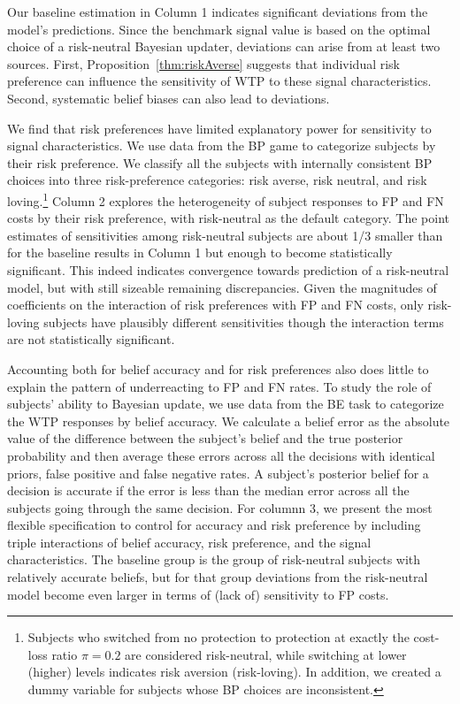 \documentclass[12pt,a4paper]{article}
\begin{document}
Our baseline estimation in Column 1 indicates significant deviations from the model's predictions. Since the benchmark signal value is based on the optimal choice of a risk-neutral Bayesian updater, deviations can arise from at least two sources. First, Proposition~\ref{thm:riskAverse} suggests that individual risk preference can influence the sensitivity of WTP to these signal characteristics. Second, systematic belief biases can also lead to deviations. 

We find that risk preferences have limited explanatory power for sensitivity to signal characteristics. We use data from the BP game to categorize subjects by their risk preference. We classify all the subjects with internally consistent BP choices into three risk-preference categories: risk averse, risk neutral, and risk loving.\footnote{Subjects who switched from no protection to protection at exactly the cost-loss ratio $\pi=0.2$ are considered risk-neutral, while switching at lower (higher) levels indicates risk aversion (risk-loving). In addition, we created a dummy variable for subjects whose BP choices are inconsistent.}  Column 2 explores the heterogeneity of subject responses to FP and FN costs by their risk preference, with risk-neutral as the default category. The point estimates of sensitivities among risk-neutral subjects are about 1/3 smaller than for the baseline results in Column 1 but enough to become statistically significant. This indeed indicates convergence towards prediction of a risk-neutral model, but with still sizeable remaining discrepancies. Given the magnitudes of coefficients on the interaction of risk preferences with FP and FN costs, only risk-loving subjects have plausibly different sensitivities though the interaction terms are not statistically significant.

Accounting both for belief accuracy and for risk preferences also does little to explain the pattern of underreacting to FP and FN rates. To study the role of subjects' ability to Bayesian update, we use data from the BE task to categorize the WTP responses by belief accuracy. We calculate a belief error as the absolute value of the difference between the subject's belief and the true posterior probability and then average these errors across all the decisions with identical priors, false positive and false negative rates. A subject's posterior belief for a decision is accurate if the error is less than the median error across all the subjects going through the same decision. For columnn 3, we present the most flexible specification to control for accuracy and risk preference by including triple interactions of belief accuracy, risk preference, and the signal characteristics. The baseline group is the group of risk-neutral subjects with relatively accurate beliefs, but for that group deviations from the risk-neutral model become even larger in terms of (lack of) sensitivity to FP costs.
\end{document}

